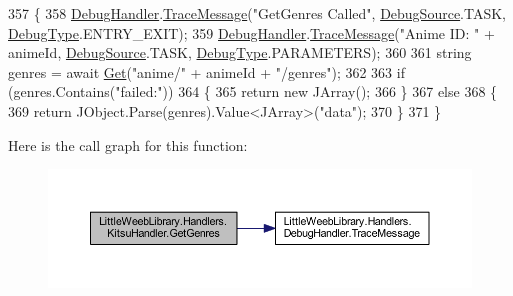 \begin{DoxyCode}
357         \{
358             \mbox{\hyperlink{class_little_weeb_library_1_1_handlers_1_1_kitsu_handler_a6d3c55fa5eee15320845c2d902c96882}{DebugHandler}}.\mbox{\hyperlink{interface_little_weeb_library_1_1_handlers_1_1_i_debug_handler_a2e405bc3492e683cd3702fae125221bc}{TraceMessage}}(\textcolor{stringliteral}{"GetGenres Called"}, 
      \mbox{\hyperlink{namespace_little_weeb_library_1_1_handlers_a2a6ca0775121c9c503d58aa254d292be}{DebugSource}}.TASK, \mbox{\hyperlink{namespace_little_weeb_library_1_1_handlers_ab66019ed40462876ec4e61bb3ccb0a62}{DebugType}}.ENTRY\_EXIT);
359             \mbox{\hyperlink{class_little_weeb_library_1_1_handlers_1_1_kitsu_handler_a6d3c55fa5eee15320845c2d902c96882}{DebugHandler}}.\mbox{\hyperlink{interface_little_weeb_library_1_1_handlers_1_1_i_debug_handler_a2e405bc3492e683cd3702fae125221bc}{TraceMessage}}(\textcolor{stringliteral}{"Anime ID: "} + animeId, 
      \mbox{\hyperlink{namespace_little_weeb_library_1_1_handlers_a2a6ca0775121c9c503d58aa254d292be}{DebugSource}}.TASK, \mbox{\hyperlink{namespace_little_weeb_library_1_1_handlers_ab66019ed40462876ec4e61bb3ccb0a62}{DebugType}}.PARAMETERS);
360 
361             \textcolor{keywordtype}{string} genres = await \mbox{\hyperlink{class_little_weeb_library_1_1_handlers_1_1_kitsu_handler_a8b7c629a03096c3152252f6b5cf2937f}{Get}}(\textcolor{stringliteral}{"anime/"} + animeId + \textcolor{stringliteral}{"/genres"});
362 
363             \textcolor{keywordflow}{if} (genres.Contains(\textcolor{stringliteral}{"failed:"}))
364             \{
365                 \textcolor{keywordflow}{return} \textcolor{keyword}{new} JArray();
366             \}
367             \textcolor{keywordflow}{else}
368             \{
369                 \textcolor{keywordflow}{return} JObject.Parse(genres).Value<JArray>(\textcolor{stringliteral}{"data"});
370             \}
371         \}
\end{DoxyCode}
Here is the call graph for this function\+:\nopagebreak
\begin{figure}[H]
\begin{center}
\leavevmode
\includegraphics[width=350pt]{class_little_weeb_library_1_1_handlers_1_1_kitsu_handler_aabd039f9220f03f5c9dcf83e104531b1_cgraph}
\end{center}
\end{figure}
\mbox{\label{class_little_weeb_library_1_1_handlers_1_1_kitsu_handler_a8d6a49dd26f66dd33ea2e2b4e9b330cb}} 
